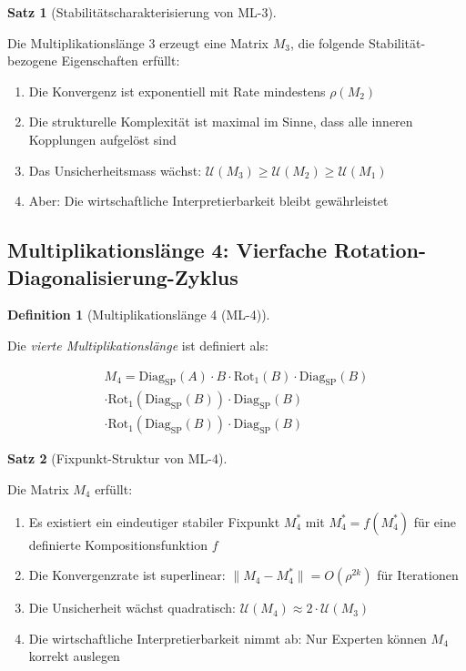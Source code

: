 \documentclass[a4paper,12pt]{article}
\theoremstyle{definition}
\newtheorem{definition}{Definition}
\newtheorem{satz}{Satz}
\begin{document}
\begin{satz}[Stabilitätscharakterisierung von ML-3]
\label{satz:ml3_stabilität}

Die Multiplikationslänge 3 erzeugt eine Matrix $M_3$, die folgende Stabilität-bezogene Eigenschaften erfüllt:

\begin{enumerate}
\item Die Konvergenz ist exponentiell mit Rate mindestens $\rho(M_2)$
\item Die strukturelle Komplexität ist maximal im Sinne, dass alle inneren Kopplungen aufgelöst sind
\item Das Unsicherheitsmass wächst: $\mathcal{U}(M_3) \geq \mathcal{U}(M_2) \geq \mathcal{U}(M_1)$
\item Aber: Die wirtschaftliche Interpretierbarkeit bleibt gewährleistet
\end{enumerate}

\end{satz}

\subsection{Multiplikationslänge 4: Vierfache Rotation-Diagonalisierung-Zyklus}

\begin{definition}[Multiplikationslänge 4 (ML-4)]
\label{def:ml4}

Die \emph{vierte Multiplikationslänge} ist definiert als:

\begin{equation}
\begin{split}
M_4 = \text{Diag}_{\text{SP}}(A) \cdot B \cdot \text{Rot}_{1}(B) \cdot \text{Diag}_{\text{SP}}(B) \\
\cdot \text{Rot}_{1}(\text{Diag}_{\text{SP}}(B)) \cdot \text{Diag}_{\text{SP}}(B) \\
\cdot \text{Rot}_{1}(\text{Diag}_{\text{SP}}(B)) \cdot \text{Diag}_{\text{SP}}(B)
\end{split}
\end{equation}

\end{definition}

\begin{satz}[Fixpunkt-Struktur von ML-4]
\label{satz:ml4_fixpunkt}

Die Matrix $M_4$ erfüllt:

\begin{enumerate}
\item Es existiert ein eindeutiger stabiler Fixpunkt $M_4^*$ mit $M_4^* = f(M_4^*)$ für eine definierte Kompositionsfunktion $f$
\item Die Konvergenzrate ist superlinear: $\|M_4 - M_4^*\| = O(\rho^{2k})$ für Iterationen
\item Die Unsicherheit wächst quadratisch: $\mathcal{U}(M_4) \approx 2 \cdot \mathcal{U}(M_3)$
\item Die wirtschaftliche Interpretierbarkeit nimmt ab: Nur Experten können $M_4$ korrekt auslegen
\end{enumerate}

\end{satz}
\end{document}

